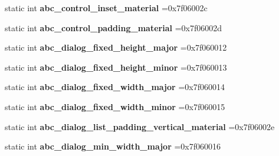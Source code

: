 \begin{DoxyCompactItemize}
\mbox{\label{classandroid_1_1support_1_1v4_1_1R_1_1dimen_aa0c109389f03e50b42812bf1630a3cfb}} 
static int {\bfseries abc\+\_\+control\+\_\+inset\+\_\+material} =0x7f06002c
\item 
\mbox{\label{classandroid_1_1support_1_1v4_1_1R_1_1dimen_a1fcc07cfb8968ee5f80ade72d2a8cc8c}} 
static int {\bfseries abc\+\_\+control\+\_\+padding\+\_\+material} =0x7f06002d
\item 
\mbox{\label{classandroid_1_1support_1_1v4_1_1R_1_1dimen_ab2be4b977691d6f595e833c4a88fad8c}} 
static int {\bfseries abc\+\_\+dialog\+\_\+fixed\+\_\+height\+\_\+major} =0x7f060012
\item 
\mbox{\label{classandroid_1_1support_1_1v4_1_1R_1_1dimen_ac4e697e5a0bb1c2c2a3c36254aee0b47}} 
static int {\bfseries abc\+\_\+dialog\+\_\+fixed\+\_\+height\+\_\+minor} =0x7f060013
\item 
\mbox{\label{classandroid_1_1support_1_1v4_1_1R_1_1dimen_a6686fec30aca252002eac83523ce6096}} 
static int {\bfseries abc\+\_\+dialog\+\_\+fixed\+\_\+width\+\_\+major} =0x7f060014
\item 
\mbox{\label{classandroid_1_1support_1_1v4_1_1R_1_1dimen_a41675019525ca6c0f22737f1e3175cf8}} 
static int {\bfseries abc\+\_\+dialog\+\_\+fixed\+\_\+width\+\_\+minor} =0x7f060015
\item 
\mbox{\label{classandroid_1_1support_1_1v4_1_1R_1_1dimen_a95453390ff00a0b5f31a3f3b20427257}} 
static int {\bfseries abc\+\_\+dialog\+\_\+list\+\_\+padding\+\_\+vertical\+\_\+material} =0x7f06002e
\item 
\mbox{\label{classandroid_1_1support_1_1v4_1_1R_1_1dimen_a1866fd2fd4049ee9882724765c27a046}} 
static int {\bfseries abc\+\_\+dialog\+\_\+min\+\_\+width\+\_\+major} =0x7f060016
\item 
\mbox{\label{classandroid_1_1support_1_1v4_1_1R_1_1dimen_a4aa0105ae818d9b89435fba7304f9cd9}} 

\end{DoxyCompactItemize}
